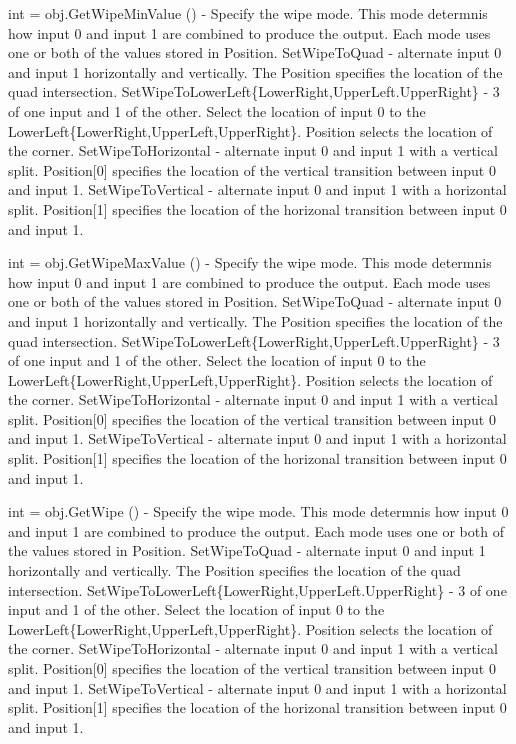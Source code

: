 \begin{DoxyItemize}
\item {\ttfamily int = obj.\-Get\-Wipe\-Min\-Value ()} -\/ Specify the wipe mode. This mode determnis how input 0 and input 1 are combined to produce the output. Each mode uses one or both of the values stored in Position. Set\-Wipe\-To\-Quad -\/ alternate input 0 and input 1 horizontally and vertically. The Position specifies the location of the quad intersection. Set\-Wipe\-To\-Lower\-Left\{Lower\-Right,Upper\-Left.\-Upper\-Right\} -\/ 3 of one input and 1 of the other. Select the location of input 0 to the Lower\-Left\{Lower\-Right,Upper\-Left,Upper\-Right\}. Position selects the location of the corner. Set\-Wipe\-To\-Horizontal -\/ alternate input 0 and input 1 with a vertical split. Position\mbox{[}0\mbox{]} specifies the location of the vertical transition between input 0 and input 1. Set\-Wipe\-To\-Vertical -\/ alternate input 0 and input 1 with a horizontal split. Position\mbox{[}1\mbox{]} specifies the location of the horizonal transition between input 0 and input 1.  
\item {\ttfamily int = obj.\-Get\-Wipe\-Max\-Value ()} -\/ Specify the wipe mode. This mode determnis how input 0 and input 1 are combined to produce the output. Each mode uses one or both of the values stored in Position. Set\-Wipe\-To\-Quad -\/ alternate input 0 and input 1 horizontally and vertically. The Position specifies the location of the quad intersection. Set\-Wipe\-To\-Lower\-Left\{Lower\-Right,Upper\-Left.\-Upper\-Right\} -\/ 3 of one input and 1 of the other. Select the location of input 0 to the Lower\-Left\{Lower\-Right,Upper\-Left,Upper\-Right\}. Position selects the location of the corner. Set\-Wipe\-To\-Horizontal -\/ alternate input 0 and input 1 with a vertical split. Position\mbox{[}0\mbox{]} specifies the location of the vertical transition between input 0 and input 1. Set\-Wipe\-To\-Vertical -\/ alternate input 0 and input 1 with a horizontal split. Position\mbox{[}1\mbox{]} specifies the location of the horizonal transition between input 0 and input 1.  
\item {\ttfamily int = obj.\-Get\-Wipe ()} -\/ Specify the wipe mode. This mode determnis how input 0 and input 1 are combined to produce the output. Each mode uses one or both of the values stored in Position. Set\-Wipe\-To\-Quad -\/ alternate input 0 and input 1 horizontally and vertically. The Position specifies the location of the quad intersection. Set\-Wipe\-To\-Lower\-Left\{Lower\-Right,Upper\-Left.\-Upper\-Right\} -\/ 3 of one input and 1 of the other. Select the location of input 0 to the Lower\-Left\{Lower\-Right,Upper\-Left,Upper\-Right\}. Position selects the location of the corner. Set\-Wipe\-To\-Horizontal -\/ alternate input 0 and input 1 with a vertical split. Position\mbox{[}0\mbox{]} specifies the location of the vertical transition between input 0 and input 1. Set\-Wipe\-To\-Vertical -\/ alternate input 0 and input 1 with a horizontal split. Position\mbox{[}1\mbox{]} specifies the location of the horizonal transition between input 0 and input 1.  

\end{DoxyItemize}
